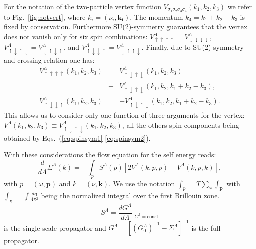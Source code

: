 For the notation of the two-particle vertex function $V_{\sigma_1\sigma_2\sigma_3\sigma_4}(k_1,k_2,k_3)$ we refer to Fig.~\ref{fig:notvert}, where $k_i=(\nu_i,\mathbf{k_i})$.
 The momentum $k_4=k_1+k_2-k_3$ is fixed by conservation.%
Furthermore  SU(2)-symmetry guarantees that the vertex does not vanish only for six spin combinations:
$
 V^\Lambda_{\uparrow\uparrow\uparrow\uparrow} = V^\Lambda_{\downarrow\downarrow\downarrow\downarrow}$, 
$  V^\Lambda_{\uparrow\downarrow\uparrow\downarrow} = V^\Lambda_{\downarrow\uparrow\downarrow\uparrow}  $, and
$  V^\Lambda_{\uparrow\downarrow\downarrow\uparrow } = V^\Lambda_{\downarrow\uparrow\uparrow\downarrow}$.   
Finally, due to SU(2) symmetry and crossing relation one has:\cite{Rohringer2012} 
\begin{eqnarray}
\nonumber
V^\Lambda_{\uparrow\uparrow\uparrow\uparrow}(k_1,k_2,k_3) &=& V^\Lambda_{\uparrow\downarrow\uparrow\downarrow}(k_1,k_2,k_3)\\&-& V^\Lambda_{\uparrow\downarrow\uparrow\downarrow}(k_1,k_2,k_1+k_2-k_3),
\label{eq:spinsym1}
 \\ 
V^\Lambda_{\uparrow\downarrow\downarrow\uparrow}(k_1,k_2,k_3)& =& -V^\Lambda_{\uparrow\downarrow\uparrow\downarrow}(k_1,k_2,k_1+k_2-k_3).
\label{eq:spinsym2}
\end{eqnarray}
This allows us to consider only one function of three arguments for the vertex:  $V^\Lambda(k_1,k_2,k_3)\equiv V^\Lambda_{\uparrow\downarrow\uparrow\downarrow}(k_1,k_2,k_3)$, all the others spin components being obtained by Eqs.~(\ref{eq:spinsym1}-\ref{eq:spinsym2})\cite{Husemann2009}. 

With these considerations the flow equation for the self energy\cite{Metzner2012} reads: 
\begin{equation}
\frac{d}{d \Lambda} \Sigma^\Lambda(k)= -\int_p  S^\Lambda(p)\left[2V^\Lambda(k,p,p) -V^\Lambda(k,p,k)\right], 
\end{equation}
with $p=(\omega,\mathbf{p})$ and $k = (\nu,\mathbf{k})$. We use the notation  $\int_{p} =T\sum_\omega \int_{\mathbf{p}}$ with $\int_{\mathbf{q}}=\int  \frac{d\mathbf{q}}{4\pi^2}$ being the normalized integral over the first Brillouin zone. 
\begin{equation}
 S^\Lambda=\frac{dG^\Lambda}{d\Lambda}\Bigg|_{\Sigma^{\Lambda}=\mathrm{const}} 
\end{equation}
  is the single-scale propagator and ${G^\Lambda}=\left[(G_0^\Lambda)^{-1}-\Sigma^\Lambda\right]^{-1}$ is the full propagator. 
  
